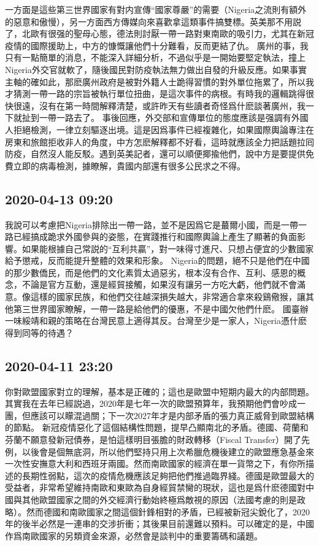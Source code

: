 \documentclass[twocolumn]{ctexart}
\begin{document}
一方面是這些第三世界國家有對内宣傳“國家尊嚴”的需要（Nigeria之流則有額外的惡意和傲慢），另一方面西方傳媒向來喜歡拿這類事件搞雙標。英美那不用説了，北歐有很强的聖母心態，德法則討厭一帶一路對東南歐的吸引力，尤其在新冠疫情的國際援助上，中方的慷慨讓他們十分難看，反而更結了仇。
廣州的事，我只有一點簡單的消息，不能深入詳細分析，不過似乎是一開始要堅定執法，撞上Nigeria外交官就軟了，隨後國民對防疫執法無力做出自發的升級反應。如果事實主軸的確如此，那麽廣州政府是被對外籍人士跪得習慣的對外單位拖累了，所以我才猜測一帶一路的宗旨被執行單位扭曲，是這次事件的病根。有時我的邏輯跳得很快很遠，沒有在第一時間解釋清楚，或許昨天有些讀者奇怪爲什麽談著廣州，我一下就扯到一帶一路去了。
事後回應，外交部和宣傳單位的態度應該是强調有外國人拒絕檢測，一律立刻驅逐出境。這是因爲事件已經複雜化，如果國際輿論專注在房東和旅館拒收非人的角度，中方怎麽解釋都不好看，這時就應該全力把話題拉囘防疫，自然沒人能反駁。遇到英美記者，還可以順便揶揄他們，說中方是要提供免費立即的病毒檢測，據瞭解，貴國内部還有很多公民求之不得。
\subsection*{2020-04-13 09:20}

我說可以考慮把Nigeria排除出一帶一路，並不是因爲它是蕞爾小國，而是一帶一路已經搞成跪求外國參與的姿態，在實踐推行和國際輿論上產生了顯著的負面影響。如果能根據自己常説的“互利共贏”，對一味得寸進尺、只想占便宜的少數國家給予懲戒，反而能提升整體的效果和形象。
Nigeria的問題，絕不只是他們在中國的那少數僑民，而是他們的文化素質太過惡劣，根本沒有合作、互利、感恩的概念，不論是官方互動，還是經貿接觸，如果沒有讓另一方吃大虧，他們就不會滿意。像這樣的國家民族，和他們交往越深損失越大，非常適合拿來殺鷄儆猴，讓其他第三世界國家瞭解，一帶一路是給他們的優惠，不是中國欠他們什麽。
國臺辦一味綏靖和親的策略在台灣民意上適得其反。台灣至少是一家人，Nigeria憑什麽得到同等的待遇？
\subsection*{2020-04-11 23:20}

你對歐盟國家對立的理解，基本是正確的；這也是歐盟中短期内最大的内部問題。其實我在去年已經説過，2020年是七年一次的歐盟預算年，我預期他們會吵成一團，但應該可以矇混過關；下一次2027年才是内部矛盾的張力真正威脅到歐盟結構的節點。
新冠疫情惡化了這個結構性問題，提早凸顯南北的矛盾。德國、荷蘭和芬蘭不願意發新冠債券，是怕這樣明目張膽的財政轉移（Fiscal Transfer）開了先例，以後會是個無底洞，所以他們堅持只用上次希臘危機後建立的歐盟應急基金來一次性安撫意大利和西班牙兩國。然而南歐國家的經濟在單一貨幣之下，有你所描述的長期性弱點，這次的疫情危機應該足夠把他們推過臨界綫。德國是歐盟最大的受益者，非常希望維持南歐和東歐為自身經貿禁臠的現狀，這也是爲什麽德國對中國與其他歐盟國家之間的外交經濟行動始終極爲敵視的原因（法國考慮的則是政略）。然而德國和南歐國家之間這個針鋒相對的矛盾，已經被新冠尖銳化了，2020年的後半必然是一連串的交涉折衝；其後果目前還難以預料。可以確定的是，中國作爲南歐國家的另類資金來源，必然會是談判中的重要籌碼和議題。
\end{document}

